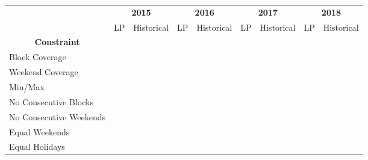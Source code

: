 \begin{table}[htbp]
	\centering
	\begin{adjustbox}{angle=90}
		\begin{tabular}{l|cc|cc|cc|cc}
			\multirow{2}[1]{*}{}                                & \multicolumn{2}{c|}{\textbf{2015}} & \multicolumn{2}{c|}{\textbf{2016}} & \multicolumn{2}{c|}{\textbf{2017}} & \multicolumn{2}{c}{\textbf{2018}} \\
			                                                    &     LP     &      Historical       &     LP     &      Historical       &     LP     &      Historical       &     LP     &      Historical      \\ \midrule
			\multicolumn{1}{c|}{\textbf{Constraint}}            &            &                       &            &                       &            &                       &            &                      \\ \midrule
			Block Coverage                                      & \checkmark &      \checkmark       & \checkmark &      \checkmark       & \checkmark &      \checkmark       & \checkmark &      \checkmark      \\
			Weekend Coverage                                    & \checkmark &      \checkmark       & \checkmark &      \checkmark       & \checkmark &      \checkmark       & \checkmark &      \checkmark      \\
			Min/Max                                             & \checkmark &      \checkmark       & \checkmark &      \checkmark       & \checkmark &      \checkmark       & \checkmark &      \checkmark      \\
			No Consecutive Blocks                               & \checkmark &                       & \checkmark &                       & \checkmark &                       & \checkmark &                      \\
			No Consecutive Weekends                             & \checkmark &                       & \checkmark &                       & \checkmark &      \checkmark       & \checkmark &      \checkmark      \\
			Equal Weekends                                      & \checkmark &                       & \checkmark &                       & \checkmark &                       & \checkmark &                      \\
			Equal Holidays                                      & \checkmark &                       & \checkmark &      \checkmark       & \checkmark &                       & \checkmark &      \checkmark      \\ \midrule

\end{tabular}
\end{adjustbox}
\end{table}
